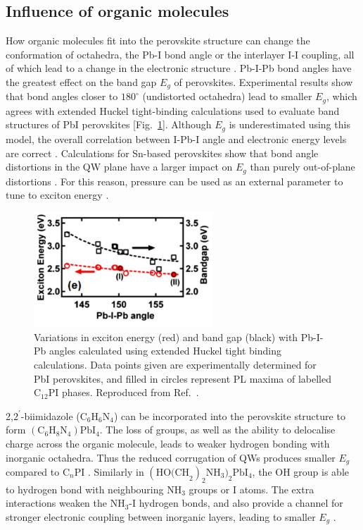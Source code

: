 \subsection{Influence of organic molecules}
How organic molecules fit into the perovskite structure can change the conformation of  octahedra, the Pb-I bond angle or the interlayer I-I coupling, all of which lead to a change in the electronic structure \cite{Sourisseau2007}. Pb-I-Pb bond angles have the greatest effect on the band gap $E_g$ of perovskites. Experimental results show that bond angles closer to $180^{\circ}$ (undistorted octahedra) lead to smaller $E_g$, which agrees with extended Huckel tight-binding calculations used to evaluate band structures of PbI perovskites [Fig.\ \ref{2Fig19}]. Although $E_g$ is underestimated using this model, the overall correlation between I-Pb-I angle and electronic energy levels are correct \cite{Pradeesh2009}. Calculations for Sn-based perovskites show that bond angle distortions in the QW plane have a larger impact on $E_g$ than purely out-of-plane distortions \cite{Knutson2005}. For this reason, pressure can be used as an external parameter to tune to exciton energy \cite{Matsuishi2001}.
\begin{figure}[h!]
\centering
\includegraphics[width=0.6\textwidth]{Fig19}
\caption{Variations in exciton energy (red) and band gap (black) with Pb-I-Pb angles calculated using extended Huckel tight binding calculations. Data points given are experimentally determined for PbI perovskites, and filled in circles represent PL maxima of labelled $\textrm{C}_{12}$PI phases. Reproduced from Ref.\ \cite{Pradeesh2009}.}
\label{2Fig19}
\end{figure}

2,$2^{'}$-biimidazole ($\textrm{C}_6\textrm{H}_6\textrm{N}_4$) can be incorporated into the perovskite structure to form $(\textrm{C}_6\textrm{H}_8\textrm{N}_4)\textrm{PbI}_4$. The loss of  groups, as well as the ability to delocalise charge across the organic molecule, leads to weaker hydrogen bonding with inorganic octahedra. Thus the reduced corrugation of QWs produces smaller $E_g$ compared to C$_n$PI \cite{Tang2001}. Similarly in $(\textrm{HO(CH}_2)_2\textrm{NH}_3)_2\textrm{PbI}_4$, the OH group is able to hydrogen bond with neighbouring $\textrm{NH}_3$ groups or I atoms. The extra interactions weaken the $\textrm{NH}_3$-I hydrogen bonds, and also provide a channel for stronger electronic coupling between inorganic layers, leading to smaller $E_g$ \cite{Mercier2004}.

